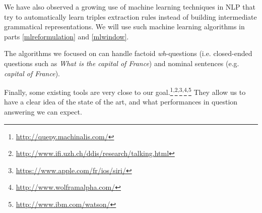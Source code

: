We have also observed a growing use of machine learning techniques in NLP that try to automatically learn triples extraction rules instead of building intermediate grammatical representations. We will use such machine learning algorithms in parts \ref{mlreformulation} and \ref{mlwindow}.

The algorithms we focused on can handle factoid \textit{wh}-questions (i.e. closed-ended questions such as \textit{What is the capital of France}) and nominal sentences (e.g. \textit{capital of France}).

Finally, some existing tools are very close to our goal.\footnote{\url{http://quepy.machinalis.com/}}\textsuperscript{,}\footnote{\url{http://www.ifi.uzh.ch/ddis/research/talking.html}}\textsuperscript{,}\footnote{\url{https://www.apple.com/fr/ios/siri/}}\textsuperscript{,}\footnote{\url{http://www.wolframalpha.com/}}\textsuperscript{,}\footnote{\url{http://www.ibm.com/watson/}} They allow us to have a clear idea of the state of the art, and what performances in question answering we can expect.
